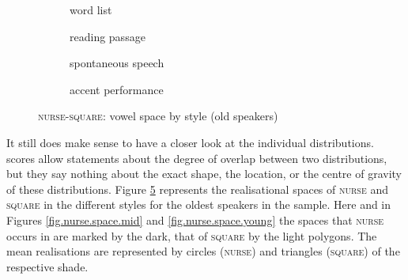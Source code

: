 \begin{figure}[h!]
	\centering
	\begin{subfigure}{.49\textwidth}
		\centering
			\resizebox{\linewidth}{!}{} 
		\caption{word list}
		\label{fig.nurse.space.old.list}
	\end{subfigure}
	\begin{subfigure}{.49\textwidth}
		\centering
			\resizebox{\linewidth}{!}{} 
		\caption{reading passage}
		\label{fig.nurse.space.old.read}
	\end{subfigure}
	
	\begin{subfigure}{.49\textwidth}
		\centering
			\resizebox{\linewidth}{!}{} 
		\caption{spontaneous speech}
		\label{fig.nurse.space.old.free}
	\end{subfigure}
	\begin{subfigure}{.49\textwidth}
		\centering
			\resizebox{\linewidth}{!}{} 
		\caption{accent performance}
		\label{fig.nurse.space.old.imit}
	\end{subfigure}
	
	\caption{\textsc{nurse}-\textsc{square}: vowel space by style (old speakers)}
	\label{fig.nurse.space.old}
\end{figure}

It still does make sense to have a closer look at the individual distributions.
 scores allow statements about the degree of overlap between two distributions, but they say nothing about the exact shape, the location, or the centre of gravity of these distributions.
Figure \ref{fig.nurse.space.old} represents the realisational spaces of \textsc{nurse} and \textsc{square} in the different styles for the oldest speakers in the sample.
Here and in Figures \ref{fig.nurse.space.mid} and \ref{fig.nurse.space.young} the  spaces that \textsc{nurse} occurs in are marked by the dark, that of \textsc{square} by the light polygons.
The mean realisations are represented by circles (\textsc{nurse}) and triangles (\textsc{square}) of the respective shade.

